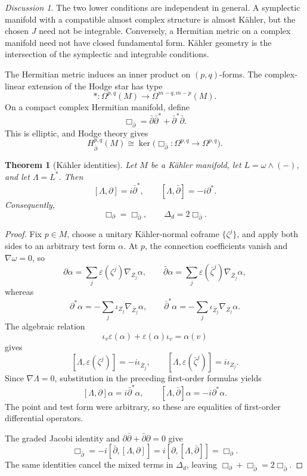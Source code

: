 \documentclass[11pt,oneside,reqno]{book}
\theoremstyle{plain}
\newtheorem{theorem}{Theorem}[chapter]
\theoremstyle{definition}
\theoremstyle{remark}
\newtheorem*{discussion}{Discussion}
\begin{document}
\begin{discussion}
The two lower conditions are independent in general. A symplectic
manifold with a compatible almost complex structure is almost Kähler, but
the chosen \(J\) need not be integrable. Conversely, a Hermitian metric on
a complex manifold need not have closed fundamental form. Kähler geometry
is the intersection of the symplectic and integrable conditions.
\end{discussion}

The Hermitian metric induces an inner product on \((p,q)\)-forms. The
complex-linear extension of the Hodge star has type
\[
 *:\Omega^{p,q}(M)\longrightarrow\Omega^{m-q,m-p}(M).
\]
On a compact complex Hermitian manifold, define
\[
 \Box_{\bar\partial}
 =
 \bar\partial\bar\partial^*
 +\bar\partial^*\bar\partial.
\]
This is elliptic, and Hodge theory gives
\[
 H^{p,q}_{\bar\partial}(M)
 \cong
 \ker\bigl(\Box_{\bar\partial}:\Omega^{p,q}\to\Omega^{p,q}\bigr).
\]

\begin{theorem}[Kähler identities]\label{thm:kahler-identities}
Let \(M\) be a Kähler manifold, let \(L=\omega\wedge(-)\), and let
\(\Lambda=L^*\). Then
\[
 [\Lambda,\partial]=i\bar\partial^*,\qquad
 [\Lambda,\bar\partial]=-i\partial^*.
\]
Consequently,
\[
 \Box_\partial=\Box_{\bar\partial},
 \qquad
 \Delta_d=2\Box_{\bar\partial}.
\]
\end{theorem}

\begin{proof}
Fix \(p\in M\), choose a unitary K\"ahler-normal coframe
\(\{\zeta^j\}\), and apply both sides to an arbitrary test form \(\alpha\).
At \(p\), the connection coefficients vanish and \(\nabla\omega=0\), so
\[
 \partial\alpha=\sum_j\varepsilon(\zeta^j)\nabla_{Z_j}\alpha,
 \qquad
 \bar\partial\alpha=\sum_j\varepsilon(\bar\zeta^j)
                              \nabla_{\bar Z_j}\alpha,
\]
whereas
\[
 \partial^*\alpha=-\sum_j\iota_{Z_j}\nabla_{\bar Z_j}\alpha,
 \qquad
 \bar\partial^*\alpha=-\sum_j\iota_{\bar Z_j}\nabla_{Z_j}\alpha.
\]
The algebraic relation
\[
 \iota_v\varepsilon(\alpha)
 +\varepsilon(\alpha)\iota_v=\alpha(v)
\]
gives
\[
 [\Lambda,\varepsilon(\zeta^j)]=-i\iota_{\bar Z_j},
 \qquad
 [\Lambda,\varepsilon(\bar\zeta^j)]=i\iota_{Z_j}.
\]
Since \(\nabla\Lambda=0\), substitution in the preceding first-order
formulas yields
\[
 [\Lambda,\partial]\alpha=i\bar\partial^*\alpha,
 \qquad
 [\Lambda,\bar\partial]\alpha=-i\partial^*\alpha.
\]
The point and test form were arbitrary, so these are equalities of
first-order differential operators.

The graded Jacobi identity and
\(\partial\bar\partial+\bar\partial\partial=0\) give
\[
 \Box_{\bar\partial}
 =-i[\bar\partial,[\Lambda,\partial]]
 =i[\partial,[\Lambda,\bar\partial]]
 =\Box_\partial.
\]
The same identities cancel the mixed terms in \(\Delta_d\), leaving
\(\Box_\partial+\Box_{\bar\partial}=2\Box_{\bar\partial}\).
\end{proof}
\end{document}
